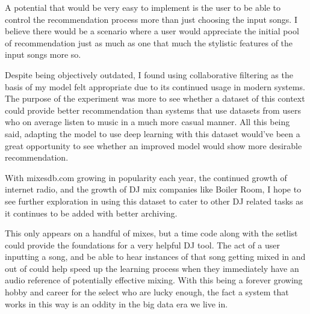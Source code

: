 A potential that would be very easy to implement is the user to be able to control the recommendation process more than just choosing the input songs. I believe there would be a scenario where a user would appreciate the initial pool of recommendation just as much as one that much the stylistic features of the input songs more so.

Despite being objectively outdated, I found using collaborative filtering as the basis of my model felt appropriate due to its continued usage in modern systems. The purpose of the experiment was more to see whether a dataset of this context could provide better recommendation than systems that use datasets from users who on average listen to music in a much  more casual manner. All this being said, adapting the model to use deep learning with this dataset would've been a great opportunity to see whether an improved model would show more desirable recommendation.

With mixesdb.com growing in popularity each year, the continued growth of internet radio, and the growth of DJ mix companies like Boiler Room, I hope to see further exploration in using this dataset to cater to other DJ related tasks as it continues to be added with better archiving. 

This only appears on a handful of mixes, but a time code along with the setlist could provide the foundations for a very helpful DJ tool. The act of a user inputting a song, and be able to hear instances of that song getting mixed in and out of could help speed up the learning process when they immediately have an audio reference of potentially effective mixing. With this being a forever growing hobby and career for the select who are lucky enough, the fact a system that works in this way is an oddity in the big data era we live in. 

 


